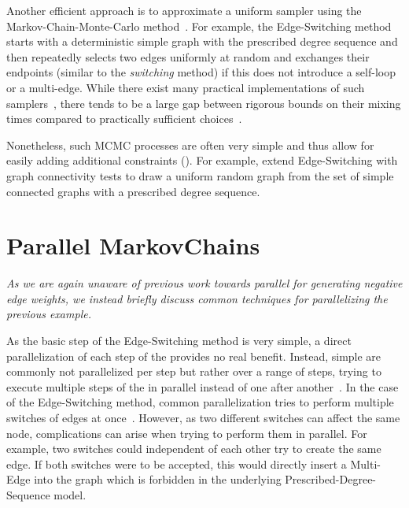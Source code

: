 Another efficient approach is to approximate a uniform sampler using the Markov-Chain-Monte-Carlo method~\cite{rao1996markov,DBLP:conf/alenex/GkantsidisMMZ03,strona2014curveball,CarstensPhd}.
For example, the Edge-Switching method starts with a deterministic simple graph with the prescribed degree sequence and then repeatedly selects two edges uniformly at random and exchanges their endpoints (similar to the \emph{switching} method) if this does not introduce a self-loop or a multi-edge.
While there exist many practical implementations of such samplers~\cite{DBLP:conf/icpp/BhuiyanCKM14, DBLP:journals/jea/HamannMPTW18,DBLP:conf/esa/CarstensH0PTW18,DBLP:conf/alenex/Allendorf0PTW22,DBLP:journals/jpdc/AllendorfMPT23}, there tends to be a large gap between rigorous bounds on their mixing times compared to practically sufficient choices~\cite{DBLP:journals/corr/abs-1903-06600,DBLP:conf/alenex/GkantsidisMMZ03, DBLP:journals/jea/HamannMPTW18, CarstensPhd}.

Nonetheless, such MCMC processes are often very simple and thus allow for easily adding additional constraints (\eg \cite{DBLP:conf/alenex/StantonP11,DBLP:journals/compnet/VigerL16,DBLP:conf/dexa/ArafatBDB20}).
For example, \cite{DBLP:journals/compnet/VigerL16} extend Edge-Switching with graph connectivity tests to draw a uniform random graph from the set of simple connected graphs with a prescribed degree sequence.


\section{Parallel MarkovChains}
\emph{
  As we are again unaware of previous work towards parallel \markovs for generating negative edge weights, we instead briefly discuss common techniques for parallelizing the previous example.
}

\bigskip

As the basic step of the Edge-Switching method is very simple, a direct parallelization of each step of the \markov provides no real benefit.
Instead, simple \markovs are commonly not parallelized per step but rather over a range of steps, \ie trying to execute multiple steps of the \markov in parallel instead of one after another~\cite{DBLP:journals/jpdc/AllendorfMPT23,DBLP:conf/esa/CarstensH0PTW18}.
In the case of the Edge-Switching method, common parallelization tries to perform multiple switches of edges at once~\cite{DBLP:journals/jpdc/AllendorfMPT23,DBLP:conf/icpp/BhuiyanCKM14}.
However, as two different switches can affect the same node, complications can arise when trying to perform them in parallel.
For example, two switches could independent of each other try to create the same edge.
If both switches were to be accepted, this would directly insert a Multi-Edge into the graph which is forbidden in the underlying Prescribed-Degree-Sequence model.

